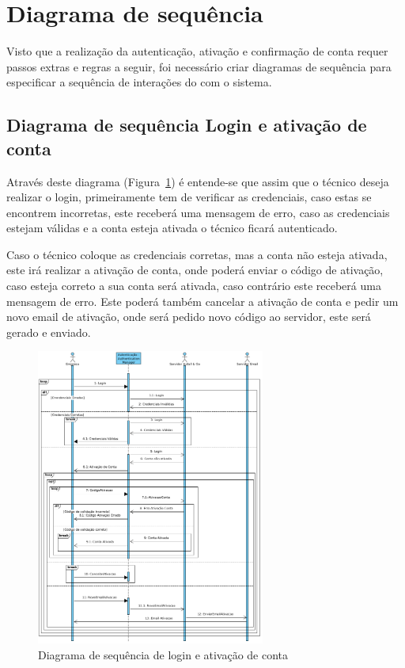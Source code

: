 \newpage

\section{Diagrama de sequência}

Visto que a realização da autenticação, ativação e confirmação de conta requer passos extras e regras a seguir, 
foi necessário criar diagramas de sequência para especificar a sequência de interações do com o sistema.

\subsection{Diagrama de sequência Login e ativação de conta}

Através deste diagrama (Figura~\ref{fig:43}) é entende-se que assim que o técnico deseja realizar o 
login, primeiramente tem de verificar as credenciais, caso estas se encontrem incorretas, este receberá 
uma mensagem de erro, caso as credenciais estejam válidas e a conta esteja ativada o técnico ficará 
autenticado. 

Caso o técnico coloque as credenciais corretas, mas a conta não esteja ativada, este irá realizar a 
ativação de conta, onde poderá enviar o código de ativação, caso esteja correto a sua conta será 
ativada, caso contrário este receberá uma mensagem de erro. Este poderá também cancelar a 
ativação de conta e pedir um novo email de ativação, onde será pedido novo código ao servidor, 
este será gerado e enviado.

\begin{figure}[htb]
    \centering
    \includegraphics[width=0.67\textwidth]{images/diagramas/sequencia/diagrama_login.png}
    \caption{Diagrama de sequência de login e ativação de conta}
    \label{fig:43}
\end{figure}

